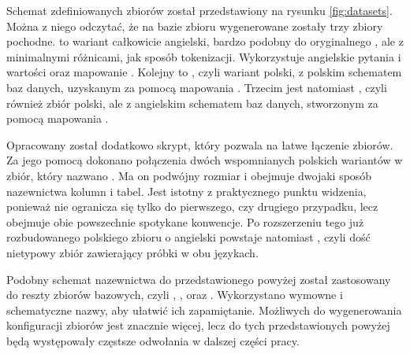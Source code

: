 Schemat zdefiniowanych zbiorów został przedstawiony na rysunku \ref{fig:datasets}. Można z niego odczytać, że na bazie zbioru  wygenerowane zostały trzy zbiory pochodne.  to wariant całkowicie angielski, bardzo podobny do oryginalnego , ale z minimalnymi różnicami, jak sposób tokenizacji. Wykorzystuje angielskie pytania i wartości oraz mapowanie . Kolejny to , czyli wariant polski, z polskim schematem baz danych, uzyskanym za pomocą mapowania . Trzecim jest natomiast \mbox{}, czyli również zbiór polski, ale z angielskim schematem baz danych, stworzonym za pomocą mapowania .

Opracowany został dodatkowo skrypt, który pozwala na łatwe łączenie zbiorów. Za jego pomocą dokonano połączenia dwóch wspomnianych polskich wariantów w zbiór, który nazwano . Ma on podwójny rozmiar i obejmuje dwojaki sposób nazewnictwa kolumn i tabel. Jest istotny z praktycznego punktu widzenia, ponieważ nie ogranicza się tylko do pierwszego, czy drugiego przypadku, lecz obejmuje obie powszechnie spotykane konwencje. Po rozszerzeniu tego już rozbudowanego polskiego zbioru o angielski  powstaje natomiast , czyli dość nietypowy zbiór zawierający próbki w obu językach.

Podobny schemat nazewnictwa do przedstawionego powyżej został zastosowany do reszty zbiorów bazowych, czyli , ,  oraz . Wykorzystano wymowne i schematyczne nazwy, aby ułatwić ich zapamiętanie. Możliwych do wygenerowania konfiguracji zbiorów jest znacznie więcej, lecz do tych przedstawionych powyżej będą występowały częstsze odwołania w dalszej części pracy.

